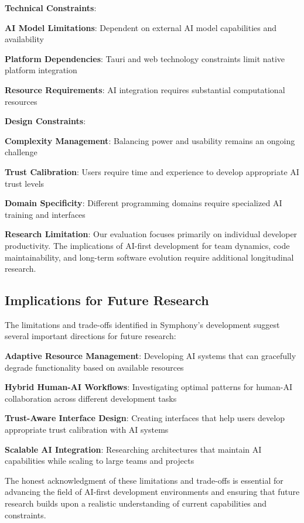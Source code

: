 \textbf{Technical Constraints}:
\begin{compactlist}
    \item \textbf{AI Model Limitations}: Dependent on external AI model capabilities and availability
    \item \textbf{Platform Dependencies}: Tauri and web technology constraints limit native platform integration
    \item \textbf{Resource Requirements}: AI integration requires substantial computational resources
\end{compactlist}

\textbf{Design Constraints}:
\begin{compactlist}
    \item \textbf{Complexity Management}: Balancing power and usability remains an ongoing challenge
    \item \textbf{Trust Calibration}: Users require time and experience to develop appropriate AI trust levels
    \item \textbf{Domain Specificity}: Different programming domains require specialized AI training and interfaces
\end{compactlist}

\begin{alertbox}
\textbf{Research Limitation}: Our evaluation focuses primarily on individual developer productivity. The implications of AI-first development for team dynamics, code maintainability, and long-term software evolution require additional longitudinal research.
\end{alertbox}

\subsection*{Implications for Future Research}

The limitations and trade-offs identified in Symphony's development suggest several important directions for future research:

\begin{expandedlist}
    \item \textbf{Adaptive Resource Management}: Developing AI systems that can gracefully degrade functionality based on available resources
    \item \textbf{Hybrid Human-AI Workflows}: Investigating optimal patterns for human-AI collaboration across different development tasks
    \item \textbf{Trust-Aware Interface Design}: Creating interfaces that help users develop appropriate trust calibration with AI systems
    \item \textbf{Scalable AI Integration}: Researching architectures that maintain AI capabilities while scaling to large teams and projects
\end{expandedlist}

The honest acknowledgment of these limitations and trade-offs is essential for advancing the field of AI-first development environments and ensuring that future research builds upon a realistic understanding of current capabilities and constraints.